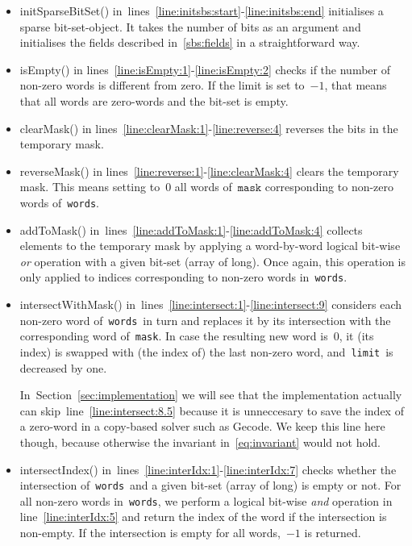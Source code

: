 \documentclass[a4paper,11pt]{article}
\newcommand{\Secref}[1]{Section~\ref{#1}}
\newcommand{\lineref}[1]{line~\ref{#1}}
\newcommand{\linesref}[2]{lines~\ref{#1}-\ref{#2}}
\newcommand{\Eqref}[1]{\eqref{#1}}
\newcommand{\Words}{\texttt{words}}
\newcommand{\Mask}{\texttt{mask}}
\newcommand{\Limit}{\texttt{limit}}
\numberwithin{equation}{section}
\begin{document}
\begin{itemize}
  \item initSparseBitSet() in~\linesref{line:initsbs:start}{line:initsbs:end}
    initialises a sparse bit-set-object. It takes 
    the number of bits as an argument and initialises the fields
    described in~\ref{sbs:fields} in a straightforward way.

  \item isEmpty() in lines~\ref{line:isEmpty:1}-\ref{line:isEmpty:2} checks
    if the number of non-zero words is different from zero. If the limit is
    set to~$-1$, that means that all words are zero-words and the bit-set
    is empty.

  \item clearMask() in lines~\ref{line:clearMask:1}-\ref{line:reverse:4}
    reverses the bits in the temporary mask.

  \item reverseMask() in lines~\ref{line:reverse:1}-\ref{line:clearMask:4}
    clears the temporary mask. This means setting to~$0$ all words of~$\Mask$
    corresponding to non-zero words of~\Words.
    

  \item addToMask() in~\linesref{line:addToMask:1}{line:addToMask:4} collects
    elements to the temporary mask by applying a word-by-word logical bit-wise
    \emph{or} operation with a given bit-set (array of long).
    Once again, this operation is only applied to indices corresponding to
    non-zero words in~\Words.

  \item intersectWithMask() in~\linesref{line:intersect:1}{line:intersect:9}
    considers each non-zero word of~\Words~in turn
    and replaces it by its intersection with the corresponding word of~\Mask.
    In case the resulting new word is~$0$, it (its index) is swapped with
    (the index of) the last non-zero word, and~\Limit~is
    decreased by one.
    
    In~\Secref{sec:implementation} we will see that the implementation
    actually can skip~\lineref{line:intersect:8.5} because it is unneccesary
    to save the index of a zero-word in a copy-based solver such as Gecode.
    We keep this
    line here though, because otherwise the invariant in~\Eqref{eq:invariant} 
    would not hold.
    
  \item intersectIndex() in~\linesref{line:interIdx:1}{line:interIdx:7}
    checks whether the intersection of~\Words~and a given bit-set
    (array of long) is empty or not. For all non-zero words in~\Words,
    we perform a logical bit-wise \emph{and} operation 
    in line~\ref{line:interIdx:5} and return
    the index of the word if the intersection is non-empty. If the
    intersection is empty for all words,~$-1$ is returned.
\end{itemize}
\end{document}
